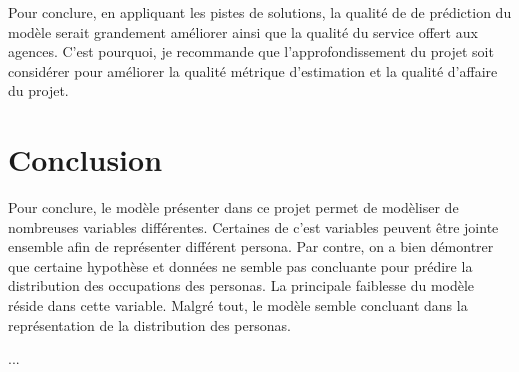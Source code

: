 \documentclass[11pt,french]{report}\usepackage[]{graphicx}\usepackage[]{color}
\begin{document}
Pour conclure, en appliquant les pistes de solutions, la qualité de de prédiction du modèle serait grandement améliorer ainsi que la qualité du service offert aux agences. C'est pourquoi, je recommande que l'approfondissement du projet soit considérer pour améliorer la qualité métrique d'estimation et la qualité d'affaire du projet.

\section*{Conclusion}
Pour conclure, le modèle présenter dans ce projet permet de modèliser de nombreuses variables différentes. Certaines de c'est variables peuvent être jointe ensemble afin de représenter différent persona. Par contre, on a bien démontrer que certaine hypothèse et données ne semble pas concluante pour prédire la distribution des occupations des personas. La principale faiblesse du modèle réside dans cette variable. Malgré tout, le modèle semble concluant dans la représentation de la distribution des personas. 

...
\end{document}
